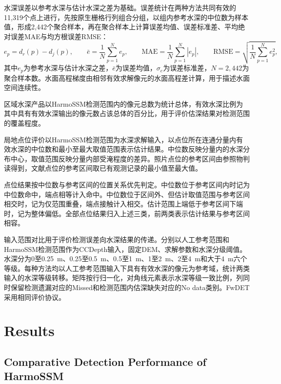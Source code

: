 \documentclass[authoryear,preprint,12pt]{elsarticle}
\begin{document}
水深误差以参考水深与估计水深之差为基础。误差统计在两种方法共同有效的11,319个点上进行，先按原生栅格行列组合分组，以组内参考水深的中位数为样本值，形成2,442个聚合样本，再在聚合样本上计算误差均值、误差标准差、平均绝对误差MAE与均方根误差RMSE：
\begin{equation}\label{eq:depth_error_stats}
 e_p=d_r(p)-d_j(p),\qquad
 \bar e=\frac{1}{N}\sum_{p=1}^{N}e_p,\qquad
 \mathrm{MAE}=\frac{1}{N}\sum_{p=1}^{N}\left|e_p\right|,\qquad
 \mathrm{RMSE}=\sqrt{\frac{1}{N}\sum_{p=1}^{N}e_p^{2}},
\end{equation}
其中\(e_p\)为参考水深与估计水深之差，\(\bar e\)为误差均值，\(\sigma_e\)为误差标准差，\(N=2{,}442\)为聚合样本数。水面高程梯度由相邻有效求解像元的水面高程差计算，用于描述水面空间连续性。

区域水深产品以HarmoSSM检测范围内的像元总数为统计总体，有效水深比例为其中具有有效水深输出的像元数占该总体的百分比，用于评价估深结果对检测范围的覆盖程度。

局地点位评价以HarmoSSM检测范围为水深求解输入，以点位所在连通分量内有效水深的中位数和最小至最大取值范围表示估计结果。中位数反映分量内的水深分布中心，取值范围反映分量内部受淹程度的差异。照片点位的参考区间由参照物判读得到，文献点位的参考区间取已有观测记录的最小值至最大值。

点位结果按中位数与参考区间的位置关系优先判定。中位数位于参考区间内时记为中位数命中，端点相等计入命中。中位数位于区间外、但估计取值范围与参考区间相交时，记为仅范围重叠，端点接触计入相交。估计范围上端低于参考区间下端时，记为整体偏低。全部点位结果归入上述三类，前两类表示估计结果与参考区间相容。

输入范围对比用于评价检测误差向水深结果的传递。分别以人工参考范围和HarmoSSM检测范围作为CCDepth输入，固定DEM、求解参数和水深分级阈值。水深分为0至0.25~m、0.25至0.5~m、0.5至1~m、1至2~m、2至4~m和大于4~m六个等级。每种方法均以人工参考范围输入下具有有效水深的像元为参考域，统计两类输入的水深等级转移。矩阵按行归一化，对角线元素表示水深等级一致比例，列同时保留检测遗漏对应的Missed和检测范围内估深缺失对应的No data类别。FwDET采用相同评价协议。

\FloatBarrier
{}
\endgroup

\section{Results}

\subsection{Comparative Detection Performance of HarmoSSM}\label{sec:detection_results}
\end{document}
